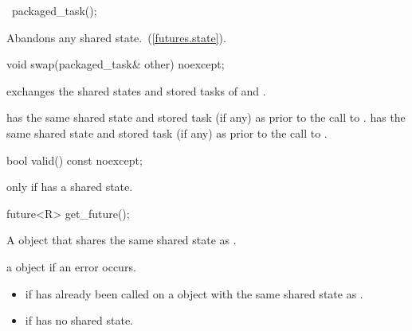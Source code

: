%
\begin{itemdecl}
~packaged_task();
\end{itemdecl}

\begin{itemdescr}
\pnum
\effects
Abandons any shared state.~(\ref{futures.state}).
\end{itemdescr}

%
%
\begin{itemdecl}
void swap(packaged_task& other) noexcept;
\end{itemdecl}

\begin{itemdescr}
\pnum
\effects exchanges the shared states and stored tasks of  and .

\pnum
\postcondition {} has the same shared state
and stored task (if any) as 
prior to the call to .  has the same shared state
and stored task (if any)
as  prior to the call to .
\end{itemdescr}

%
%
\begin{itemdecl}
bool valid() const noexcept;
\end{itemdecl}

\begin{itemdescr}
\pnum
\returns {} only if  has a shared state.
\end{itemdescr}

%
%
\begin{itemdecl}
future<R> get_future();
\end{itemdecl}

\begin{itemdescr}
\pnum
\returns A  object that shares the same shared state as .

\pnum
\throws a  object if an error occurs.

\pnum
\errors
\begin{itemize}
\item {} if  has already been called on
a  object with the same shared state as .
\item {} if  has no shared state.
\end{itemize}
\end{itemdescr}

